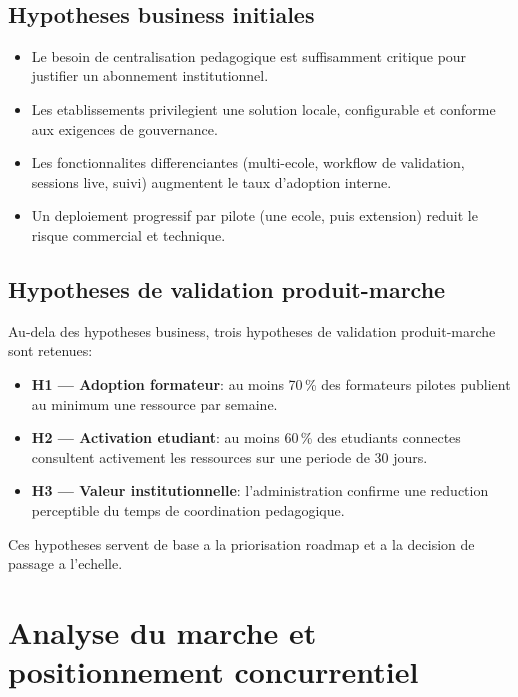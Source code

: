 ﻿﻿\documentclass[12pt,a4paper,oneside]{report}
\begin{document}
\subsection{Hypotheses business initiales}

\begin{itemize}
  \item Le besoin de centralisation pedagogique est suffisamment critique pour justifier un abonnement institutionnel.
  \item Les etablissements privilegient une solution locale, configurable et conforme aux exigences de gouvernance.
  \item Les fonctionnalites differenciantes (multi-ecole, workflow de validation, sessions live, suivi) augmentent le taux d'adoption interne.
  \item Un deploiement progressif par pilote (une ecole, puis extension) reduit le risque commercial et technique.
\end{itemize}

\subsection{Hypotheses de validation produit-marche}

Au-dela des hypotheses business, trois hypotheses de validation produit-marche sont retenues:
\begin{itemize}
  \item \textbf{H1 --- Adoption formateur}: au moins 70\,\% des formateurs pilotes publient au minimum une ressource par semaine.
  \item \textbf{H2 --- Activation etudiant}: au moins 60\,\% des etudiants connectes consultent activement les ressources sur une periode de 30 jours.
  \item \textbf{H3 --- Valeur institutionnelle}: l'administration confirme une reduction perceptible du temps de coordination pedagogique.
\end{itemize}

Ces hypotheses servent de base a la priorisation roadmap et a la decision de passage a l'echelle.

\section{Analyse du marche et positionnement concurrentiel}
\end{document}
